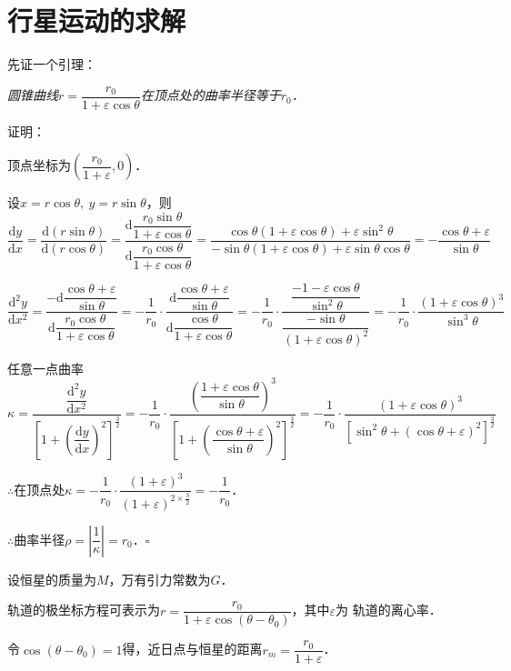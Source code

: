 \documentclass[UTF8,fontset=none,linespread=1.2]{ctexart}
\newcommand{\upd}{\mathrm{d}}
\begin{document}
\section*{行星运动的求解}
\noindent 先证一个引理：

\textit{圆锥曲线$r=\dfrac{r_0}{1+\varepsilon\cos\theta}$在顶点处的曲率半径等于$r_0$．}

\noindent 证明：

顶点坐标为$\left(\dfrac{r_0}{1+\varepsilon},0\right)$．

设$x=r\cos\theta,\ y=r\sin\theta$，则
$$\dfrac{\upd y}{\upd x}
=\dfrac{\upd\left(r\sin\theta\right)}{\upd\left(r\cos\theta\right)}
=\dfrac{\upd\dfrac{r_0\sin\theta}{1+\varepsilon\cos\theta}}{\upd\dfrac{r_0\cos\theta}{1+\varepsilon\cos\theta}}
=\dfrac{\cos\theta(1+\varepsilon\cos\theta)+\varepsilon\sin^2\theta}{-\sin\theta(1+\varepsilon\cos\theta)+\varepsilon\sin\theta\cos\theta}
=-\dfrac{\cos\theta+\varepsilon}{\sin\theta}$$

$$\dfrac{\upd^2y}{\upd x^2}
=\dfrac{-\upd\dfrac{\cos\theta+\varepsilon}{\sin\theta}}{\upd\dfrac{r_0\cos\theta}{1+\varepsilon\cos\theta}}
=-\dfrac1{r_0}\cdot\dfrac{\upd\dfrac{\cos\theta+\varepsilon}{\sin\theta}}{\upd\dfrac{\cos\theta}{1+\varepsilon\cos\theta}}
=-\dfrac1{r_0}\cdot\dfrac{\dfrac{-1-\varepsilon\cos\theta}{\sin^2\theta}}{\dfrac{-\sin\theta}{(1+\varepsilon\cos\theta)^2}}
=-\dfrac1{r_0}\cdot\dfrac{(1+\varepsilon\cos\theta)^3}{\sin^3\theta}$$

任意一点曲率
$$\kappa=\dfrac{\dfrac{\upd^2y}{\upd x^2}}{\left[1+\left(\dfrac{\upd y}{\upd x}\right)^2\right]^{\frac32}}
=-\dfrac1{r_0}\cdot\dfrac{\left(\dfrac{1+\varepsilon\cos\theta}{\sin\theta}\right)^3}{\left[1+\left(\dfrac{\cos\theta+\varepsilon}{\sin\theta}\right)^2\right]^{\frac32}}
=-\dfrac1{r_0}\cdot\dfrac{(1+\varepsilon\cos\theta)^3}{\left[\sin^2\theta+(\cos\theta+\varepsilon)^2\right]^{\frac32}}$$

$\therefore$在顶点处$\kappa=-\dfrac{1}{r_0}\cdot\dfrac{(1+\varepsilon)^3}{(1+\varepsilon)^{2\times\frac32}}=-\dfrac1{r_0}$．

$\therefore$曲率半径$\rho=\left|\dfrac1\kappa\right|=r_0$．\hfill$\square$

\vspace{4ex}
设恒星的质量为$M$，万有引力常数为$G$．

轨道的极坐标方程可表示为$r=\dfrac{r_0}{1+\varepsilon\cos(\theta-\theta_0)}$，其中$\varepsilon$为
轨道的离心率．

令$\cos(\theta-\theta_0)=1$得，近日点与恒星的距离$r_m=\dfrac{r_0}{1+\varepsilon}$．
\end{document}

